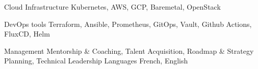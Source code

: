 
\begin{cvskills}
\cvskill
    {Cloud Infrastructure}
    {Kubernetes, AWS, GCP, Baremetal, OpenStack}

  \cvskill
    {DevOps tools}
    {Terraform, Ansible, Prometheus, GitOps, Vault, Github Actions, FluxCD, Helm}

  \cvskill
    {Management}
    {Mentorship \& Coaching, Talent Acquisition, Roadmap \& Strategy Planning, Technical Leadership}
  \cvskill
    {Languages} %
    {French, English} %
\end{cvskills}


